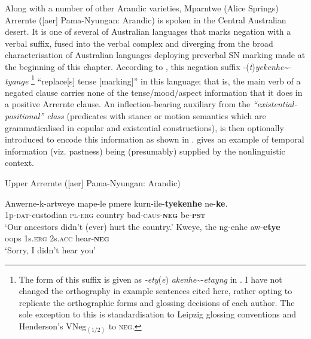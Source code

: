 \documentclass[output=paper]{langsci/langscibook}
\begin{document}
Along with a number of other Arandic varieties, Mparntwe (Alice Springs)
Arrernte ([aer] Pama-Nyungan: Arandic) is spoken in the
Central Australian desert. It is one of several of Australian languages
that marks negation with a verbal suffix, fused into the verbal complex and
diverging from the broad characterisation of Australian languages deploying
preverbal SN marking made at the beginning of this chapter. According to
\citet[71]{Wilkins1989}, this negation suffix
-(\textit{t})\textit{yekenhe\textasciitilde-tyange}%
%
\footnote{The form of this suffix is given as
\textit{-ety}(\textit{e})\textdblhyphen
\textit{akenhe}\textasciitilde-\textit{etayng} in \citealt{Henderson2013}. I have not changed the orthography in example sentences cited here, rather opting to replicate the orthographic forms and glossing decisions of each author. The sole exception to this is standardisation to Leipzig glossing conventions and Henderson's VNeg$_{(1/2)} $ to \textsc{neg}.} 
%
``replace[s] tense [marking]'' in this language; that is, the main verb of
a negated clause carries none of the tense\slash mood\slash aspect
information that it does in a positive Arrernte clause. An
inflection-bearing auxiliary from the \textit{``existential-positional''
class} (predicates with stance or motion semantics which are
grammaticalised in copular and existential constructions), is then
optionally introduced to encode this information as shown in
.  gives an example of temporal information (viz. pastness) being (presumably) supplied by the nonlinguistic context.
%
\begin{exe}\ex\label{ex:austr-arrernte-ancestors-hear} 
    Upper Arrernte ([aer] Pama-Nyungan: Arandic)
    \begin{xlist}
        \ex\label{ex:austr-arrernte-ancestors} 
        \gll Anwerne-k-artweye mape-le pmere kurn-ile-\textbf{tyekenhe} ne-\textbf{ke}.\\
1p\textsc{-dat-}custodian \textsc{pl-erg} country bad\textsc{-caus-\textbf{neg}} be-\textsc{\textbf{pst}}\\
\glt `Our ancestors didn't (ever) hurt the country.' \hfill \citep[235]{Wilkins1989}
%
    \ex\label{ex:austr-arrernte-hear}
    \gll Kweye, the ng-enhe aw-\textbf{etye}\\
oops 1s.\textsc{erg} 2s.\textsc{acc} hear-\textbf{\textsc{neg}}\\
\glt `Sorry, I didn't hear you' \hfill \citep[412]{Henderson2013}
    \end{xlist}\end{exe}
\end{document}

